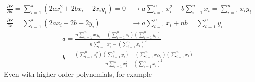 \documentclass[class=report, crop=false, 12pt,a4paper]{standalone}
\begin{document}
\begin{align}
  \frac{\partial S}{\partial a} = \sum_{i = 1}^n (2 ax_i^2 + 2bx_i - 2x_i y_i) = 0 &\rightarrow a\sum_{i=1}^n x_i^2 + b\sum_{i +1}^n x_i = \sum_{i=1}^n x_i y_i\\
  \frac{\partial S}{\partial b} = \sum_{i=1}^n (2ax_i + 2b - 2y_i) &\rightarrow a\sum_{i=1}^n x_i + nb = \sum_{i=1}^n y_i
\end{align}
\begin{gather}
  a = \frac{n \sum_{i=1}^n x_i y_i - \left(\sum_{i=1}^n x_i\right)\left(\sum_{i=1}^n y_i\right)}{n\sum_{i=1}^n x_i^2 - \left(\sum_{i=1}^n x_i\right)^2}\\
  b = \frac{\left(\sum_{i=1}^n x_i^2\right) \left(\sum_{i=1}^n y_i\right) - \left(\sum_{i=1}^n x_i y_i\right)\left(\sum_{i=1}^n x_i\right)}{n\sum_{i=1}^n x_i^2 - \left(\sum_{i=1}^n x_i\right)^2}
\end{gather}
Even with higher order polynomials, for example
\begin{equation}
  
\end{equation}
\end{document}
